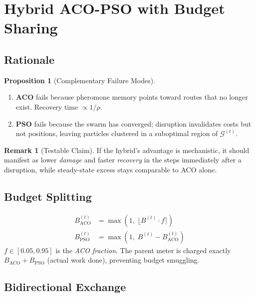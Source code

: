 \documentclass[11pt,a4paper]{article}
\theoremstyle{definition}
\newtheorem{proposition}{Proposition}[section]
\newtheorem{remark}{Remark}[section]
\newcommand{\calG}{\mathcal{G}}
\begin{document}
\section{Hybrid ACO-PSO with Budget Sharing}
\label{sec:hybrid}

\subsection{Rationale}

\begin{proposition}[Complementary Failure Modes]
  \begin{enumerate}[label=(\roman*)]
    \item \textbf{ACO} fails because pheromone memory points toward routes that no longer
          exist.  Recovery time $\propto 1/\rho$.
    \item \textbf{PSO} fails because the swarm has converged; disruption invalidates
          costs but not positions, leaving particles clustered in a suboptimal region of
          $\calG^{(t)}$.
  \end{enumerate}
\end{proposition}

\begin{remark}[Testable Claim]
  If the hybrid's advantage is mechanistic, it should manifest as lower
  \emph{damage} and faster \emph{recovery} in the steps immediately after a
  disruption, while steady-state excess stays comparable to ACO alone.
\end{remark}

\subsection{Budget Splitting}

\begin{align}
  B_{\mathrm{ACO}}^{(t)} &= \max\!\left(1,\;\bigl\lfloor B^{(t)}\cdot f\bigr\rceil\right) \\
  B_{\mathrm{PSO}}^{(t)} &= \max\!\left(1,\;B^{(t)}-B_{\mathrm{ACO}}^{(t)}\right)
\end{align}
$f\in[0.05,0.95]$ is the \emph{ACO fraction}.  The parent meter is charged exactly
$B_{\mathrm{ACO}}+B_{\mathrm{PSO}}$ (actual work done), preventing budget smuggling.

\subsection{Bidirectional Exchange}
\end{document}
